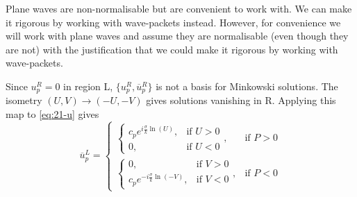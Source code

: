 Plane waves are non-normalisable but are convenient to work with.
We can make it rigorous by working with wave-packets instead. However, for convenience we will work with plane waves and assume they are normalisable (even though they are not) with the justification that we could make it rigorous by working with wave-packets.

Since $u_p^R = 0$ in region L, $\{u_p^R, \overline{u}{}_p^R\}$ is not a basis for Minkowski solutions.
The isometry $(U, V) \to (-U, -V)$ gives solutions vanishing in R. Applying this map to \eqref{eq:21-u} gives
\begin{equation}
  \overline{u}{}_p^L = 
  \begin{cases}
    \begin{cases}
      c_p e^{i \frac{\sigma}{k} \ln (U)}, & \text{if } U > 0 \\
      0, & \text{if } U < 0 
    \end{cases}
    , & \text{if } P >0 \\
    \begin{cases}
      0, & \text{if } V > 0 \\
      c_p e^{-i \frac{\sigma}{k} \ln (-V)}, & \text{if } V < 0 
    \end{cases}
    , & \text{if }  P < 0
  \end{cases}
\end{equation}

